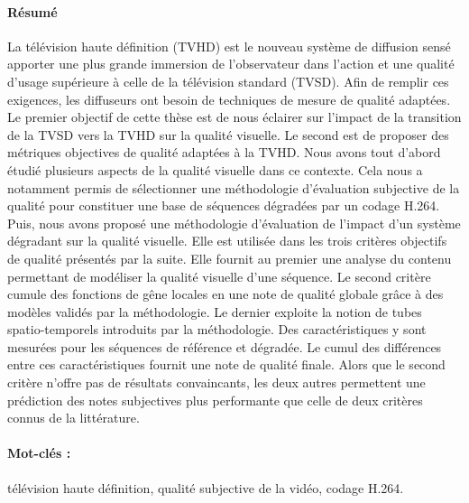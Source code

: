 \paragraph*{Résumé}
La télévision haute définition (TVHD) est le nouveau système de diffusion sensé apporter une plus grande immersion de l'observateur dans l'action et une qualité d'usage supérieure à celle de la télévision standard (TVSD). Afin de remplir ces exigences, les diffuseurs ont besoin de techniques de mesure de qualité adaptées. Le premier objectif de cette thèse est de nous éclairer sur l'impact de la transition de la TVSD vers la TVHD sur la qualité visuelle. Le second est de proposer des métriques objectives de qualité adaptées à la TVHD. Nous avons tout d'abord étudié plusieurs aspects de la qualité visuelle dans ce contexte. Cela nous a notamment permis de sélectionner une méthodologie d'évaluation subjective de la qualité pour constituer une base de séquences dégradées par un codage H.264. Puis, nous avons proposé une méthodologie d'évaluation de l'impact d'un système dégradant sur la qualité visuelle. Elle est utilisée dans les trois critères objectifs de qualité présentés par la suite. Elle fournit au premier une analyse du contenu permettant de modéliser la qualité visuelle d'une séquence. Le second critère cumule des fonctions de gêne locales en une note de qualité globale grâce à des modèles validés par la méthodologie. Le dernier exploite la notion de tubes spatio-temporels introduits par la méthodologie. Des caractéristiques y sont mesurées pour les séquences de référence et dégradée. Le cumul des différences entre ces caractéristiques fournit une note de qualité finale. Alors que le second critère n'offre pas de résultats convaincants, les deux autres permettent une prédiction des notes subjectives plus performante que celle de deux critères connus de la littérature.

\paragraph*{Mot-clés :} télévision haute définition, qualité subjective de la vidéo, codage H.264.

\pagestyle{empty}

